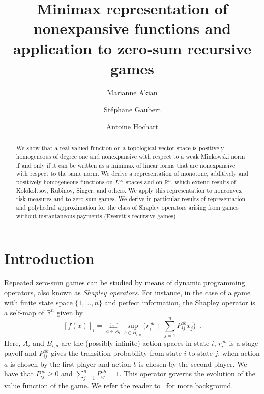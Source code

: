\documentclass[a4paper,11pt]{amsart}
\title[Minimax representation of nonexpansive functions]{Minimax representation of nonexpansive functions and application to zero-sum recursive games}
\author[M. Akian]{Marianne Akian}
\author[S. Gaubert]{St\'ephane Gaubert}
\author[A. Hochart]{Antoine Hochart}
\theoremstyle{definition}
\theoremstyle{remark}
\begin{document}
\begin{abstract}
  We show that a real-valued function on a topological vector space is positively homogeneous of degree one and nonexpansive with respect to a weak Minkowski norm if and only if it can be written as a minimax of linear forms that are nonexpansive with respect to the same norm.
  We derive a representation of monotone, additively and positively homogeneous functions on $L^\infty$ spaces and on $\mathbb{R}^n$, which
extend results of Kolokoltsov, Rubinov,  Singer, and others.
We apply this representation to nonconvex risk measures and to zero-sum games. We derive in particular results of representation and polyhedral approximation for the class of Shapley operators arising from games without instantaneous payments (Everett's recursive games). 
\end{abstract}



\maketitle

\section{Introduction}

Repeated zero-sum games can be studied by means of dynamic programming operators,
also known as {\em Shapley operators}.
For instance, in the case of a game with finite state space $\{1,\dots,n\}$ and perfect information,
the Shapley operator is a self-map of ${\mathbb{R}}^n$ given by
\begin{equation}
  \label{eq:ShapleyOperator}
  [f(x)]_i = \inf_{a \in A_i} \sup_{b \in B_{i,a}} \big( r^{ab}_i + \sum_{j=1}^n P^{ab}_{ij} x_j \big) \enspace .
\end{equation}
Here, $A_i$ and $B_{i,a}$ are the (possibly infinite) action spaces in state $i$,
$r_i^{a b}$ is a stage payoff and $P_{i j}^{a b}$ gives the transition probability from state $i$ to state $j$,
when action $a$ is chosen by the first player and action $b$ is chosen by the second player.
We have that $P_{i j}^{a b} {\geqslant} 0$ and $\sum_{j=1}^n P_{i j}^{a b} = 1$.
This operator governs the evolution of the value function of the game.
We refer the reader to~\cite{FV97,NS03,Sor04} for more background.
\end{document}

